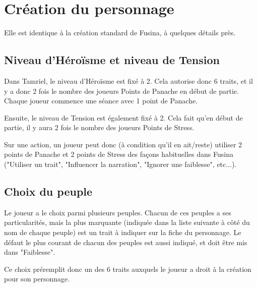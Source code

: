 \chapter{Création du personnage}

Elle est identique à la création standard de Fusina, à quelques détails près.

\section{Niveau d'Héroïsme et niveau de Tension}

Dans Tamriel, le niveau d'Héroïsme est fixé à 2. Cela autorise donc 6 traits, et il y a donc 2 fois le nombre des joueurs Points de Panache en début de partie. Chaque joueur commence une séance avec 1 point de Panache.

Ensuite, le niveau de Tension est également fixé à 2. Cela fait qu'en début de partie, il y aura 2 fois le nombre des joueurs Points de Stress.

Sur une action, un joueur peut donc (à condition qu'il en ait/reste) utiliser 2 points de Panache et 2 points de Stress des façons habituelles dans Fusina ("Utiliser un trait", "Influencer la narration", "Ignorer une faiblesse", etc...).


\section{Choix du peuple}

Le joueur a le choix parmi plusieurs peuples. Chacun de ces peuples a ses particularités, mais la plus marquante (indiquée dans la liste suivante à côté du nom de chaque peuple) est un trait à indiquer sur la fiche du personnage. Le défaut le plus courant de chacun des peuples est aussi indiqué, et doit être mis dans "Faiblesse".

Ce choix préremplit donc un des 6 traits auxquels le joueur a droit à la création pour son personnage.

